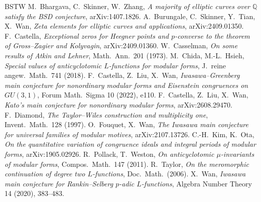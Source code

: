 \documentclass[11pt]{amsart}
\newcommand{\Q}{\mathbb{Q}}
\begin{document}
\begin{thebibliography}{BSTW}\small
{} M.~Bhargava, C.~Skinner, W.~Zhang, \emph{A majority of elliptic curves over $\Q$ satisfy the BSD conjecture}, arXiv:1407.1826.
 A.~Burungale, C.~Skinner, Y.~Tian, X.~Wan, \emph{Zeta elements for elliptic curves and applications}, arXiv:2409.01350.
 F.~Castella, \emph{Exceptional zeros for Heegner points and $p$-converse to the theorem of Gross--Zagier and Kolyvagin}, arXiv:2409.01360.
 W.~Casselman, \emph{On some results of Atkin and Lehner}, Math.\ Ann.\ 201 (1973).
 M.~Chida, M.-L.~Hsieh, \emph{Special values of anticyclotomic $L$-functions for modular forms}, J.\ reine angew.\ Math.\ 741 (2018).
 F.~Castella, Z.~Liu, X.~Wan, \emph{Iwasawa--Greenberg main conjecture for nonordinary modular forms and Eisenstein congruences on $GU(3,1)$}, Forum Math.\ Sigma 10 (2022), e110.
 F.~Castella, Z.~Liu, X.~Wan, \emph{Kato's main conjecture for nonordinary modular forms}, arXiv:2608.29470.
 F.~Diamond, \emph{The Taylor--Wiles construction and multiplicity one}, Invent.\ Math.\ 128 (1997).
 O.~Fouquet, X.~Wan, \emph{The Iwasawa main conjecture for universal families of modular motives}, arXiv:2107.13726.
 C.-H.~Kim, K.~Ota, \emph{On the quantitative variation of congruence ideals and integral periods of modular forms}, arXiv:1905.02926.
 R.~Pollack, T.~Weston, \emph{On anticyclotomic $\mu$-invariants of modular forms}, Compos.\ Math.\ 147 (2011).
 R.~Taylor, \emph{On the meromorphic continuation of degree two $L$-functions}, Doc.\ Math.\ (2006).
 X.~Wan, \emph{Iwasawa main conjecture for Rankin--Selberg $p$-adic $L$-functions}, Algebra Number Theory 14 (2020), 383--483.
\end{thebibliography}
\end{document}
